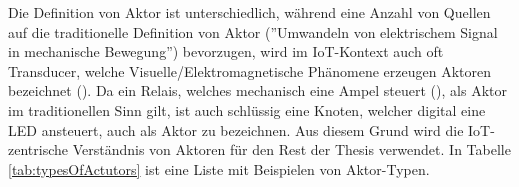 \begin{table}[H]
\centering
{}
\caption{Typen von Aktoren}
\label{tab:typesOfActutors}
\end{table}

Die Definition von Aktor ist unterschiedlich, während eine Anzahl von Quellen auf die traditionelle Definition von Aktor (''Umwandeln von elektrischem Signal in mechanische Bewegung'') bevorzugen, wird im \ac{IoT}-Kontext auch oft Transducer, welche Visuelle/Elektromagnetische Phänomene erzeugen Aktoren bezeichnet (\cite{Dunko2006reference}). Da ein Relais, welches mechanisch eine Ampel steuert (\cite{salarian2012coordination}), als Aktor im traditionellen Sinn gilt, ist auch schlüssig eine Knoten, welcher digital eine LED ansteuert, auch als Aktor zu bezeichnen. Aus diesem Grund wird die \ac{IoT}-zentrische Verständnis von Aktoren für den Rest der Thesis verwendet. In Tabelle \ref{tab:typesOfActutors} ist eine Liste mit Beispielen von Aktor-Typen. 

